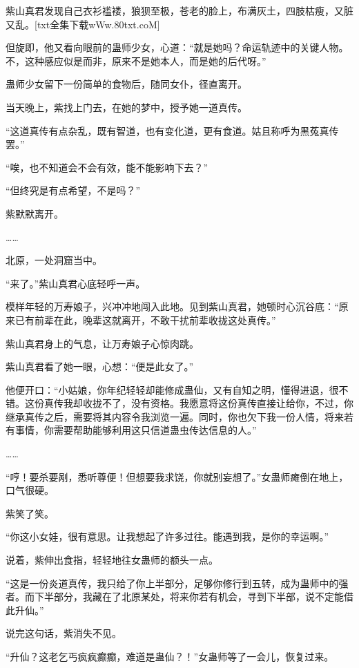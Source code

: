 
\begin{this_body}

紫山真君发现自己衣衫褴褛，狼狈至极，苍老的脸上，布满灰土，四肢枯瘦，又脏又乱。[txt全集下载wWw.80txt.coM]

但旋即，他又看向眼前的蛊师少女，心道：“就是她吗？命运轨迹中的关键人物。不，这种感应似是而非，原来不是她本人，而是她的后代呀。”

蛊师少女留下一份简单的食物后，随同女仆，径直离开。

当天晚上，紫找上门去，在她的梦中，授予她一道真传。

“这道真传有点杂乱，既有智道，也有变化道，更有食道。姑且称呼为黑菟真传罢。”

“唉，也不知道会不会有效，能不能影响下去？”

“但终究是有点希望，不是吗？”

紫默默离开。

……

北原，一处洞窟当中。

“来了。”紫山真君心底轻呼一声。

模样年轻的万寿娘子，兴冲冲地闯入此地。见到紫山真君，她顿时心沉谷底：“原来已有前辈在此，晚辈这就离开，不敢干扰前辈收拢这处真传。”

紫山真君身上的气息，让万寿娘子心惊肉跳。

紫山真君看了她一眼，心想：“便是此女了。”

他便开口：“小姑娘，你年纪轻轻却能修成蛊仙，又有自知之明，懂得进退，很不错。这份真传我却收拢不了，没有资格。我愿意将这份真传直接让给你，不过，你继承真传之后，需要将其内容令我浏览一遍。同时，你也欠下我一份人情，将来若有事情，你需要帮助能够利用这只信道蛊虫传达信息的人。”

……

“哼！要杀要剐，悉听尊便！但想要我求饶，你就别妄想了。”女蛊师瘫倒在地上，口气很硬。

紫笑了笑。

“你这小女娃，很有意思。让我想起了许多过往。能遇到我，是你的幸运啊。”

说着，紫伸出食指，轻轻地往女蛊师的额头一点。

“这是一份炎道真传，我只给了你上半部分，足够你修行到五转，成为蛊师中的强者。而下半部分，我藏在了北原某处，将来你若有机会，寻到下半部，说不定能借此升仙。”

说完这句话，紫消失不见。

“升仙？这老乞丐疯疯癫癫，难道是蛊仙？！”女蛊师等了一会儿，恢复过来。


\end{this_body}
